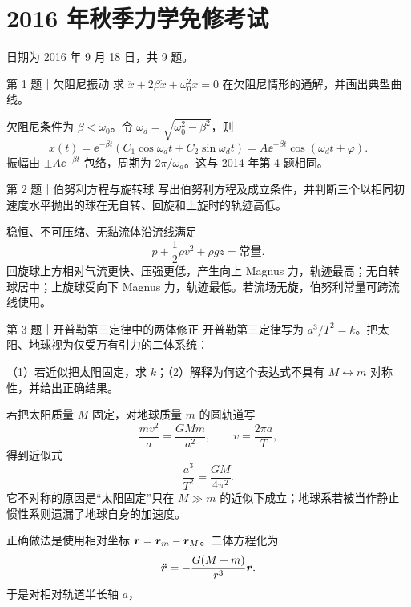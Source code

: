 \chapter{2016 年秋季力学免修考试}
\noindent{}\quad{}\qquad 日期为 2016 年 9 月 18 日，共 9 题。

\begin{problem}{第 1 题｜欠阻尼振动}
求 $\ddot x+2\beta\dot x+\omega_0^2x=0$ 在欠阻尼情形的通解，并画出典型曲线。
\end{problem}
\begin{solution}
欠阻尼条件为 $\beta<\omega_0$。令 $\omega_d=\sqrt{\omega_0^2-\beta^2}$，则
\[
x(t)=\ee^{-\beta t}(C_1\cos\omega_dt+C_2\sin\omega_dt)
=A\ee^{-\beta t}\cos(\omega_dt+\varphi).
\]
振幅由 $\pm A\ee^{-\beta t}$ 包络，周期为 $2\pi/\omega_d$。这与 2014 年第 4 题相同。
\end{solution}

\begin{problem}{第 2 题｜伯努利方程与旋转球}
写出伯努利方程及成立条件，并判断三个以相同初速度水平抛出的球在无自转、回旋和上旋时的轨迹高低。
\FigMagnus
\end{problem}
\begin{solution}
稳恒、不可压缩、无黏流体沿流线满足
\[
p+\frac12\rho v^2+\rho gz=\text{常量}.
\]
回旋球上方相对气流更快、压强更低，产生向上 Magnus 力，轨迹最高；无自转球居中；上旋球受向下 Magnus 力，轨迹最低。若流场无旋，伯努利常量可跨流线使用。
\end{solution}

\begin{problem}{第 3 题｜开普勒第三定律中的两体修正}
开普勒第三定律写为 $a^3/T^2=k$。把太阳、地球视为仅受万有引力的二体系统：

（1）若近似把太阳固定，求 $k$；（2）解释为何这个表达式不具有 $M\leftrightarrow m$ 对称性，并给出正确结果。
\end{problem}
\begin{solution}
若把太阳质量 $M$ 固定，对地球质量 $m$ 的圆轨道写
\[
\frac{mv^2}{a}=\frac{GMm}{a^2},
\qquad v=\frac{2\pi a}{T},
\]
得到近似式
\[
\frac{a^3}{T^2}=\frac{GM}{4\pi^2}.
\]
它不对称的原因是“太阳固定”只在 $M\gg m$ 的近似下成立；地球系若被当作静止惯性系则遗漏了地球自身的加速度。

正确做法是使用相对坐标 $\bm{r}=\bm{r}_m-\bm{r}_M$。二体方程化为
\[
\ddot{\bm{r}}=-\frac{G(M+m)}{r^3}\bm{r}.
\]
于是对相对轨道半长轴 $a$，
\end{solution}

